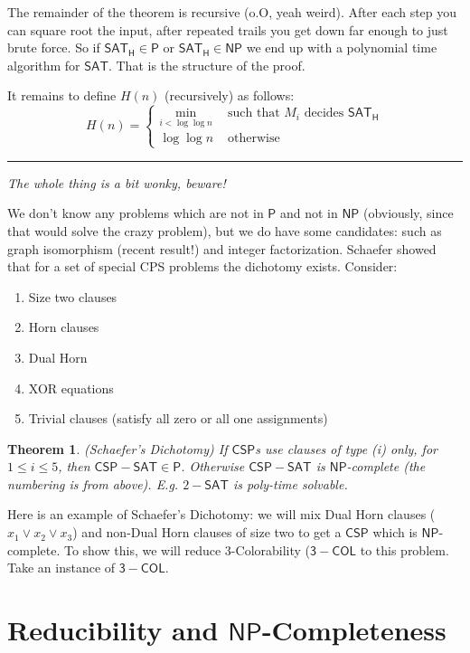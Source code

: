 \documentclass[twoside]{article}
\newcounter{lecnum}
\newtheorem{theorem}{Theorem}[lecnum]
\newenvironment{proof}{{\bf Proof:}}{\hfill\rule{2mm}{2mm}}
\begin{document}
\begin{proof}
The remainder of the theorem is recursive (o.O, yeah weird). After each step you can square root the input, after repeated trails you get down far enough to just brute force. So if $\mathsf{SAT_H} \in \mathsf{P}$ or $\mathsf{SAT_H} \in \mathsf{NP}$ we end up with a polynomial time algorithm for $\mathsf{SAT}$. That is the structure of the proof.

It remains to define $H(n)$ (recursively) as follows:
\[
H(n) = \begin{cases}
\min_{i < \log\log n} &\mbox{ such that } M_i \mbox{ decides } \mathsf{SAT_H} \\
\log\log n &\mbox{ otherwise }
\end{cases}
\]
\end{proof}

\emph{The whole thing is a bit wonky, beware!}

We don't know any problems which are not in $\mathsf{P}$ and not in $\mathsf{NP}$ (obviously, since that would solve the crazy problem), but we do have some candidates: such as graph isomorphism (recent result!) and integer factorization. Schaefer showed that for a set of special CPS problems the dichotomy exists. Consider:

\begin{enumerate}
\item Size two clauses
\item Horn clauses
\item Dual Horn
\item XOR equations
\item Trivial clauses (satisfy all zero or all one assignments)
\end{enumerate}

\begin{theorem}
(Schaefer's Dichotomy) If $\mathsf{CSP}$s use clauses of type (i) only, for $1 \leq i \leq 5$, then $\mathsf{CSP-SAT} \in \mathsf{P}$. Otherwise $\mathsf{CSP-SAT}$ is $\mathsf{NP}$-complete (the numbering is from above). E.g. $2-\mathsf{SAT}$ is poly-time solvable.  
\end{theorem}

Here is an example of Schaefer's Dichotomy: we will mix Dual Horn clauses ($x_1 \lor x_2 \lor x_3$) and non-Dual Horn clauses of size two to get a $\mathsf{CSP}$ which is $\mathsf{NP}$-complete. To show this, we will reduce 3-Colorability ($\mathsf{3-COL}$ to this problem. Take an instance of $\mathsf{3-COL}$. 

\section{Reducibility and $\mathsf{NP}$-Completeness}
\end{document}
